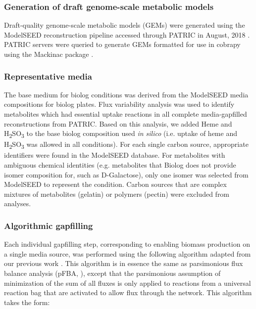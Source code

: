 \documentclass[11pt,twocolumn,notitlepage,openany,twoside]{book}
\begin{document}
\begin{refsection}
\subsubsection{Generation of draft genome-scale metabolic models}

Draft-quality genome-scale metabolic models (GEMs) were generated using the ModelSEED reconstruction pipeline \cite{Henry2010-um} accessed through PATRIC in August, 2018 \cite{Wattam2017-tk}. PATRIC servers were queried to generate GEMs formatted for use in cobrapy \cite{Ebrahim2013-eb} using the Mackinac package \cite{Mundy2017-eb}.

\subsubsection{Representative media}

The base medium for biolog conditions was derived from the ModelSEED media compositions for biolog plates. Flux variability analysis was used to identify metabolites which had essential uptake reactions in all complete media-gapfilled reconstructions from PATRIC. Based on this analysis, we added Heme and H\textsubscript{2}SO\textsubscript{3} to the base biolog composition used \textit{in silico} (i.e. uptake of heme and H\textsubscript{2}SO\textsubscript{3} was allowed in all conditions). For each single carbon source, appropriate identifiers were found in the ModelSEED database. For metabolites with ambiguous chemical identities (e.g. metabolites that Biolog does not provide isomer composition for, such as D-Galactose), only one isomer was selected from ModelSEED to represent the condition. Carbon sources that are complex mixtures of metabolites (gelatin) or polymers (pectin) were excluded from analyses.

\subsubsection{Algorithmic gapfilling}

Each individual gapfilling step, corresponding to enabling biomass production on a single media source, was performed using the following algorithm adapted from our previous work \cite{Biggs2017-md}. This algorithm is in essence the same as parsimonious flux balance analysis (pFBA, \cite{Lewis2010-xs}), except that the parsimonious assumption of minimization of the sum of all fluxes is only applied to reactions from a universal reaction bag that are activated to allow flux through the network. This algorithm takes the form:


\end{refsection}
\end{document}
